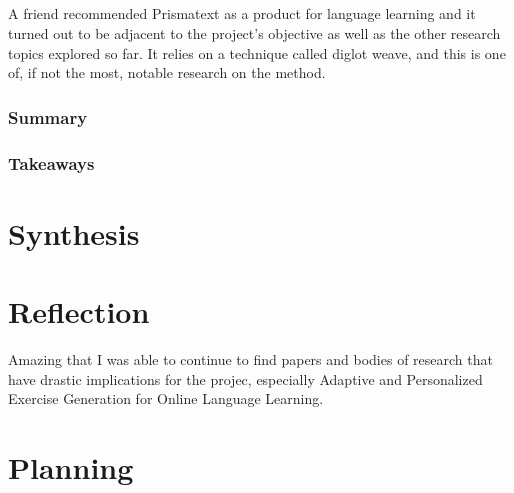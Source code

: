 \documentclass[
	letterpaper, %
]{jdf}
\begin{document}
\subsection{}
A friend recommended Prismatext as a product for language learning and it turned out to be adjacent to the project's objective as well as the other research topics explored so far. It relies on a technique called diglot weave, and this is one of, if not the most, notable research on the method.

\subsubsection{Summary}


\subsubsection{Takeaways}


\section{Synthesis}


\section{Reflection}
Amazing that I was able to continue to find papers and bodies of research that have drastic implications for the projec, especially Adaptive and Personalized Exercise Generation  for Online Language Learning.

\section{Planning}


\printbibliography{}
\end{document}
